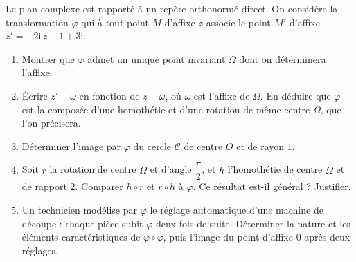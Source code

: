 \documentclass[11pt]{article}
\begin{document}
\begin{exercice}
Le plan complexe est rapporté à un repère orthonormé direct. On considère la transformation $\varphi$ qui à tout point $M$ d'affixe $z$ associe le point $M'$ d'affixe $z' = -2\mathrm{i}\,z + 1 + 3\mathrm{i}$.
\begin{enumerate}
\item Montrer que $\varphi$ admet un unique point invariant $\Omega$ dont on déterminera l'affixe.
\item Écrire $z' - \omega$ en fonction de $z - \omega$, où $\omega$ est l'affixe de $\Omega$. En déduire que $\varphi$ est la composée d'une homothétie et d'une rotation de même centre $\Omega$, que l'on précisera.
\item Déterminer l'image par $\varphi$ du cercle $\mathcal{C}$ de centre $O$ et de rayon $1$.
\item Soit $r$ la rotation de centre $\Omega$ et d'angle $\dfrac{\pi}{2}$, et $h$ l'homothétie de centre $\Omega$ et de rapport $2$. Comparer $h \circ r$ et $r \circ h$ à $\varphi$. Ce résultat est-il général ? Justifier.
\item Un technicien modélise par $\varphi$ le réglage automatique d'une machine de découpe : chaque pièce subit $\varphi$ deux fois de suite. Déterminer la nature et les éléments caractéristiques de $\varphi \circ \varphi$, puis l'image du point d'affixe $0$ après deux réglages.
\end{enumerate}
\end{exercice}
\end{document}
